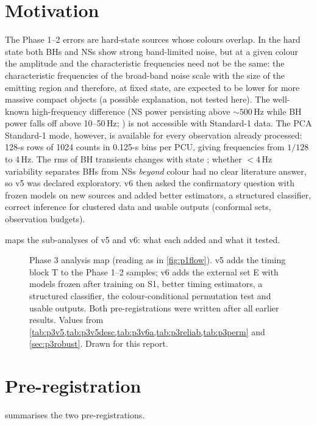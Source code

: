 \section{Motivation}
The Phase 1--2 errors are hard-state sources whose colours overlap. In the hard state both BHs and NSs show strong
band-limited noise, but at a given colour the amplitude and the characteristic frequencies need not be the same: the
characteristic frequencies of the broad-band noise scale with the size of the emitting region and therefore, at fixed
state, are expected to be lower for more massive compact objects (a possible explanation, not tested here). The
well-known high-frequency difference (NS power persisting above $\sim500$\,Hz while BH power falls off above
10--50\,Hz; \citealp{SunyaevRevnivtsev2000}) is not accessible with Standard-1 data. The PCA Standard-1 mode, however, is
available for every observation already processed: 128-s rows of 1024 counts in 0.125-s bins per PCU, giving
frequencies from $1/128$ to 4\,Hz. The rms of BH transients changes with state \citep{MunozDarias2011}; whether
$<4$\,Hz variability separates BHs from NSs \emph{beyond} colour had no clear literature answer, so v5 was declared
exploratory. v6 then asked the confirmatory question with frozen models on new sources and added better estimators,
a structured classifier, correct inference for clustered data and usable outputs (conformal sets, observation budgets).

 maps the sub-analyses of v5 and v6: what each added and what it tested.

\begin{figure}[htbp]
\centering

\caption[Phase 3 analysis map]{Phase 3 analysis map (reading as in \cref{fig:p1flow}). v5 adds the timing block T to the Phase 1--2
samples; v6 adds the external set E with models frozen after training on S1, better timing estimators, a structured classifier,
the colour-conditional permutation test and usable outputs. Both pre-registrations were written after all earlier results.
Values from \cref{tab:p3v5,tab:p3v5desc,tab:p3v6a,tab:p3reliab,tab:p3perm} and \cref{sec:p3robust}. Drawn for this report.}
\label{fig:p3flow}
\end{figure}

\section{Pre-registration}
 summarises the two pre-registrations.

